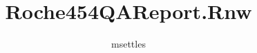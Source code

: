 \documentclass[a4paper]{article}
\begin{document}
\title{Roche454QAReport.Rnw}
\author{msettles}

\maketitle
\end{document}
